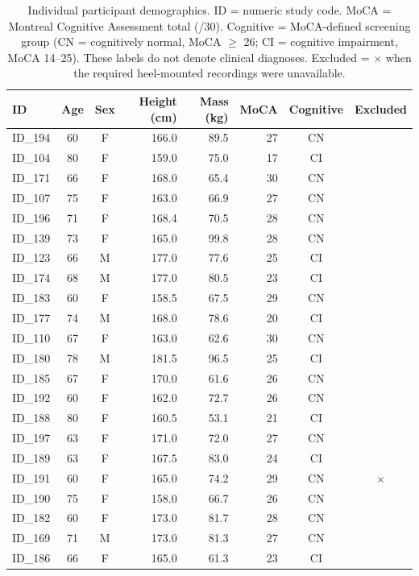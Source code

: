 \documentclass[fleqn,10pt,lineno]{wlpeerj}
\begin{document}
\begin{table}[!ht]
\centering
\caption{Individual participant demographics. ID = numeric study code. MoCA = Montreal Cognitive Assessment total (/30). Cognitive = MoCA-defined screening group (CN = cognitively normal, MoCA $\geq$ 26; CI = cognitive impairment, MoCA 14--25). These labels do not denote clinical diagnoses. Excluded = $\times$ when the required heel-mounted recordings were unavailable.}
\label{tab:s_demographics}
\footnotesize
\begin{tabular}{@{}lccrrrcc@{}}
\toprule
ID & Age & Sex & Height (cm) & Mass (kg) & MoCA & Cognitive & Excluded \\
\midrule
ID\_194 & 60 & F & 166.0 & 89.5 & 27 & CN & \\
ID\_104 & 80 & F & 159.0 & 75.0 & 17 & CI & \\
ID\_171 & 66 & F & 168.0 & 65.4 & 30 & CN & \\
ID\_107 & 75 & F & 163.0 & 66.9 & 27 & CN & \\
ID\_196 & 71 & F & 168.4 & 70.5 & 28 & CN & \\
ID\_139 & 73 & F & 165.0 & 99.8 & 28 & CN & \\
ID\_123 & 66 & M & 177.0 & 77.6 & 25 & CI & \\
ID\_174 & 68 & M & 177.0 & 80.5 & 23 & CI & \\
ID\_183 & 60 & F & 158.5 & 67.5 & 29 & CN & \\
ID\_177 & 74 & M & 168.0 & 78.6 & 20 & CI & \\
ID\_110 & 67 & F & 163.0 & 62.6 & 30 & CN & \\
ID\_180 & 78 & M & 181.5 & 96.5 & 25 & CI & \\
ID\_185 & 67 & F & 170.0 & 61.6 & 26 & CN & \\
ID\_192 & 60 & F & 162.0 & 72.7 & 26 & CN & \\
ID\_188 & 80 & F & 160.5 & 53.1 & 21 & CI & \\
ID\_197 & 63 & F & 171.0 & 72.0 & 27 & CN & \\
ID\_189 & 63 & F & 167.5 & 83.0 & 24 & CI & \\
ID\_191 & 60 & F & 165.0 & 74.2 & 29 & CN & $\times$ \\
ID\_190 & 75 & F & 158.0 & 66.7 & 26 & CN & \\
ID\_182 & 60 & F & 173.0 & 81.7 & 28 & CN & \\
ID\_169 & 71 & M & 173.0 & 81.3 & 27 & CN & \\
ID\_186 & 66 & F & 165.0 & 61.3 & 23 & CI & \\

\end{tabular}
\end{table}
\end{document}
